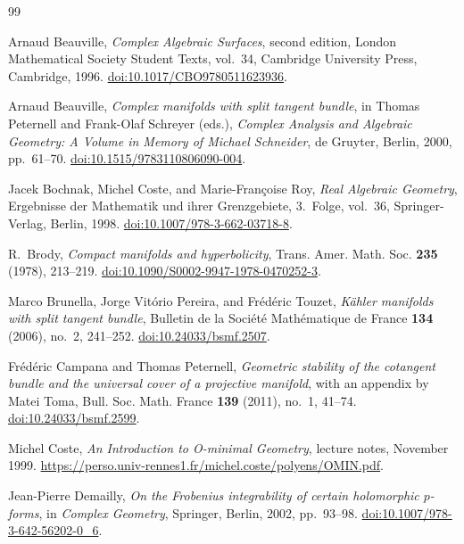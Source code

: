 \begin{thebibliography}{99}
\raggedright

Arnaud Beauville,
\emph{Complex Algebraic Surfaces}, second edition,
London Mathematical Society Student Texts, vol.~34,
Cambridge University Press, Cambridge, 1996.
\href{https://doi.org/10.1017/CBO9780511623936}{doi:10.1017/CBO9780511623936}.

Arnaud Beauville,
\emph{Complex manifolds with split tangent bundle},
in Thomas Peternell and Frank-Olaf Schreyer (eds.),
\emph{Complex Analysis and Algebraic Geometry: A Volume in Memory of Michael Schneider},
de Gruyter, Berlin, 2000, pp.~61--70.
\href{https://doi.org/10.1515/9783110806090-004}{doi:10.1515/9783110806090-004}.

Jacek Bochnak, Michel Coste, and Marie-Fran\c{c}oise Roy,
\emph{Real Algebraic Geometry},
Ergebnisse der Mathematik und ihrer Grenzgebiete, 3.~Folge, vol.~36,
Springer-Verlag, Berlin, 1998.
\href{https://doi.org/10.1007/978-3-662-03718-8}{doi:10.1007/978-3-662-03718-8}.

R.~Brody,
\emph{Compact manifolds and hyperbolicity},
Trans. Amer. Math. Soc. \textbf{235} (1978), 213--219.
\href{https://doi.org/10.1090/S0002-9947-1978-0470252-3}{doi:10.1090/S0002-9947-1978-0470252-3}.

Marco Brunella, Jorge Vit\'orio Pereira, and Fr\'ed\'eric Touzet,
\emph{K\"ahler manifolds with split tangent bundle},
Bulletin de la Soci\'et\'e Math\'ematique de France
\textbf{134} (2006), no.~2, 241--252.
\href{https://doi.org/10.24033/bsmf.2507}{doi:10.24033/bsmf.2507}.

Fr\'ed\'eric Campana and Thomas Peternell,
\emph{Geometric stability of the cotangent bundle and the universal cover
of a projective manifold}, with an appendix by Matei Toma,
Bull. Soc. Math. France \textbf{139} (2011), no.~1, 41--74.
\href{https://doi.org/10.24033/bsmf.2599}{doi:10.24033/bsmf.2599}.

Michel Coste,
\emph{An Introduction to O-minimal Geometry},
lecture notes, November 1999.
\url{https://perso.univ-rennes1.fr/michel.coste/polyens/OMIN.pdf}.

Jean-Pierre Demailly,
\emph{On the Frobenius integrability of certain holomorphic $p$-forms},
in \emph{Complex Geometry}, Springer, Berlin, 2002, pp.~93--98.
\href{https://doi.org/10.1007/978-3-642-56202-0_6}{doi:10.1007/978-3-642-56202-0\_6}.


\end{thebibliography}
